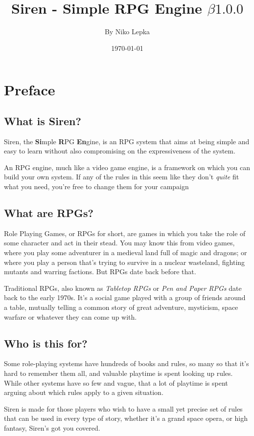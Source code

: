 \documentclass[a4paper]{book}
\title{Siren - Simple RPG Engine $\beta1.0.0$}
\author{By Niko Lepka}
\date{\today}
\begin{document}
\maketitle

\chapter*{Preface}
\section*{What is Siren?}
Siren, the \textbf{Si}mple \textbf{R}PG \textbf{En}gine, is an RPG system that aims at being simple and easy to learn without also compromising on the expressiveness of the system.

An RPG engine, much like a video game engine, is a framework on which you can build your own system. If any of the rules in this seem like they don't \textit{quite} fit what you need, you're free to change them for your campaign

\section*{What are RPGs?}
Role Playing Games, or RPGs for short, are games in which you take the role of some character and act in their stead.
You may know this from video games, where you play some adventurer in a medieval land full of magic and dragons; or where you play a person that's trying to survive in a nuclear wasteland, fighting mutants and warring factions.
But RPGs date back before that.

Traditional RPGs, also known as \textit{Tabletop RPGs} or \textit{Pen and Paper RPGs} date back to the early 1970s.
It's a social game played with a group of friends around a table, mutually telling a common story of great adventure, mysticism, space warfare or whatever they can come up with.

\section*{Who is this for?}
Some role-playing systems have hundreds of books and rules, so many so that it's hard to remember them all, and valuable playtime is spent looking up rules. 
While other systems have so few and vague, that a lot of playtime is spent arguing about which rules apply to a given situation.

Siren is made for those players who wish to have a small yet precise set of rules that can be used in every type of story, whether it's a grand space opera, or high fantasy, Siren's got you covered.
\end{document}
